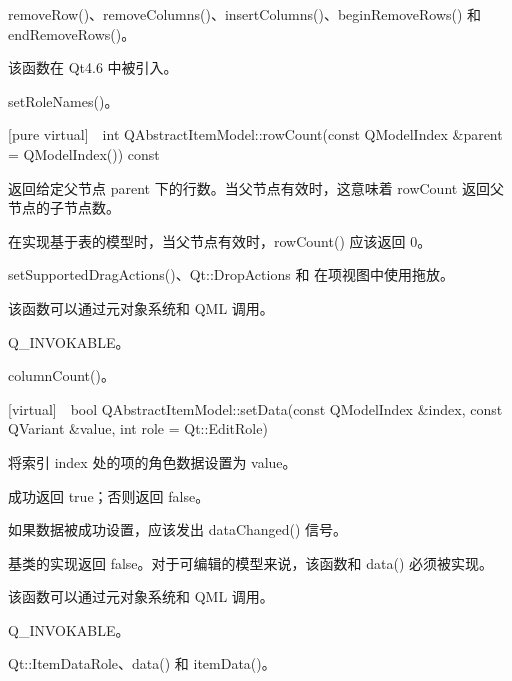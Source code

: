\begin{seeAlso}
removeRow()、removeColumns()、insertColumns()、beginRemoveRows() 和 endRemoveRows()。
\end{seeAlso}

该函数在 Qt4.6 中被引入。

\begin{seeAlso}
setRoleNames()。
\end{seeAlso}

[pure virtual] int QAbstractItemModel::rowCount(const QModelIndex \&parent = QModelIndex()) const

返回给定父节点 parent 下的行数。当父节点有效时，这意味着 rowCount 返回父节点的子节点数。 

\begin{notice}
在实现基于表的模型时，当父节点有效时，rowCount() 应该返回 0。
\end{notice}

\begin{seeAlso}
setSupportedDragActions()、Qt::DropActions 和 在项视图中使用拖放。
\end{seeAlso}

\begin{notice}
该函数可以通过元对象系统和 QML 调用。
\end{notice}

\begin{seeAlso}
Q\_INVOKABLE。
\end{seeAlso}

\begin{seeAlso}
columnCount()。
\end{seeAlso}

[virtual] bool QAbstractItemModel::setData(const QModelIndex \&index, const QVariant \&value, int role = Qt::EditRole)

将索引 index 处的项的角色数据设置为 value。

成功返回 true；否则返回 false。

如果数据被成功设置，应该发出 dataChanged() 信号。

基类的实现返回 false。对于可编辑的模型来说，该函数和 data() 必须被实现。

\begin{notice}
该函数可以通过元对象系统和 QML 调用。
\end{notice}

\begin{seeAlso}
Q\_INVOKABLE。
\end{seeAlso}

\begin{seeAlso}
Qt::ItemDataRole、data() 和 itemData()。
\end{seeAlso}

